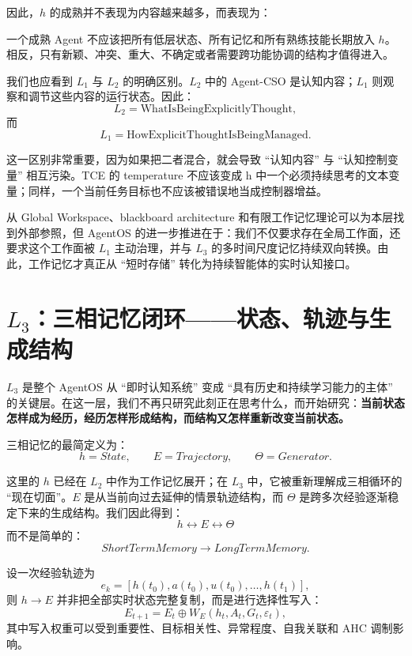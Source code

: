 因此，$h$ 的成熟并不表现为内容越来越多，而表现为：
\begin{statementbox}
\centering
{}
\end{statementbox}
一个成熟 Agent 不应该把所有低层状态、所有记忆和所有熟练技能长期放入 $h$。相反，只有新颖、冲突、重大、不确定或者需要跨功能协调的结构才值得进入。

我们也应看到 $L_1$ 与 $L_2$ 的明确区别。$L_2$ 中的 Agent-CSO 是认知内容；$L_1$ 则观察和调节这些内容的运行状态。因此：
\[
\boxed{
L_2=\text{WhatIsBeingExplicitlyThought},
}
\]
而
\[
\boxed{
L_1=\text{HowExplicitThoughtIsBeingManaged}.
}
\]

这一区别非常重要，因为如果把二者混合，就会导致 ``认知内容'' 与 ``认知控制变量'' 相互污染。TCE 的 temperature 不应该变成 h 中一个必须持续思考的文本变量；同样，一个当前任务目标也不应该被错误地当成控制器增益。

从 Global Workspace、blackboard architecture 和有限工作记忆理论可以为本层找到外部参照，但 AgentOS 的进一步推进在于：我们不仅要求存在全局工作面，还要求这个工作面被 $L_1$ 主动治理，并与 $L_3$ 的多时间尺度记忆持续双向转换。由此，工作记忆才真正从 ``短时存储'' 转化为持续智能体的实时认知接口。

\section{$L_3$：三相记忆闭环——状态、轨迹与生成结构}

$L_3$ 是整个 AgentOS 从 ``即时认知系统'' 变成 ``具有历史和持续学习能力的主体'' 的关键层。在这一层，我们不再只研究此刻正在思考什么，而开始研究：\textbf{当前状态怎样成为经历，经历怎样形成结构，而结构又怎样重新改变当前状态。}

三相记忆的最简定义为：
\[
\boxed{
h=State,\qquad
E=Trajectory,\qquad
\Theta=Generator.
}
\]

这里的 $h$ 已经在 $L_2$ 中作为工作记忆展开；在 $L_3$ 中，它被重新理解成三相循环的 ``现在切面''。$E$ 是从当前向过去延伸的情景轨迹结构，而 $\Theta$ 是跨多次经验逐渐稳定下来的生成结构。我们因此得到：
\[
\boxed{
h
\leftrightarrow
E
\leftrightarrow
\Theta
}
\]
而不是简单的：
\[
ShortTermMemory\rightarrow LongTermMemory.
\]

设一次经验轨迹为
\[
e_k
=
\left[
h(t_0),
a(t_0),
u(t_0),
\ldots,
h(t_1)
\right],
\]
则 $h\rightarrow E$ 并非把全部实时状态完整复制，而是进行选择性写入：
\[
E_{t+1}
=
E_t
\oplus
W_E
\left(
h_t,
A_t,
G_t,
\varepsilon_t
\right),
\]
其中写入权重可以受到重要性、目标相关性、异常程度、自我关联和 AHC 调制影响。

